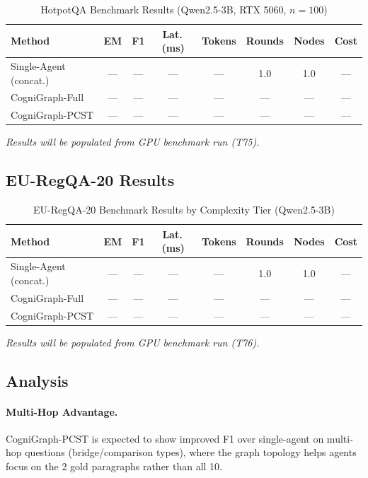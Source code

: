 \documentclass[a4paper,11pt]{article}
\theoremstyle{definition}
\begin{document}
\begin{table}[ht]
\centering
\caption{HotpotQA Benchmark Results (Qwen2.5-3B, RTX 5060, $n=100$)}
\label{tab:hotpotqa_results}
\begin{tabular}{lccccccc}
\toprule
\textbf{Method} & \textbf{EM} & \textbf{F1} & \textbf{Lat.\,(ms)} & \textbf{Tokens} & \textbf{Rounds} & \textbf{Nodes} & \textbf{Cost} \\
\midrule
Single-Agent (concat.) & --- & --- & --- & --- & 1.0 & 1.0 & --- \\
CogniGraph-Full & --- & --- & --- & --- & --- & --- & --- \\
CogniGraph-PCST & --- & --- & --- & --- & --- & --- & --- \\
\bottomrule
\end{tabular}

\smallskip
{\footnotesize\textit{Results will be populated from GPU benchmark run (T75).}}
\end{table}

\subsection{EU-RegQA-20 Results}

\begin{table}[ht]
\centering
\caption{EU-RegQA-20 Benchmark Results by Complexity Tier (Qwen2.5-3B)}
\label{tab:regqa_results}
\begin{tabular}{lccccccc}
\toprule
\textbf{Method} & \textbf{EM} & \textbf{F1} & \textbf{Lat.\,(ms)} & \textbf{Tokens} & \textbf{Rounds} & \textbf{Nodes} & \textbf{Cost} \\
\midrule
Single-Agent (concat.) & --- & --- & --- & --- & 1.0 & 1.0 & --- \\
CogniGraph-Full & --- & --- & --- & --- & --- & --- & --- \\
CogniGraph-PCST & --- & --- & --- & --- & --- & --- & --- \\
\bottomrule
\end{tabular}

\smallskip
{\footnotesize\textit{Results will be populated from GPU benchmark run (T76).}}
\end{table}

\subsection{Analysis}

\paragraph{Multi-Hop Advantage.}
CogniGraph-PCST is expected to show improved F1 over single-agent on multi-hop questions (bridge/comparison types), where the graph topology helps agents focus on the 2 gold paragraphs rather than all 10.
\end{document}

